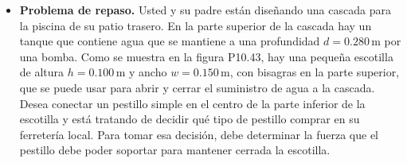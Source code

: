 \documentclass[11pt,a4paper]{article}
\begin{document}
\begin{itemize}
    \item[\textbf{43.}] \textbf{Problema de repaso.} Usted y su padre están diseñando una cascada para la piscina de su patio trasero. En la parte superior de la cascada hay un tanque que contiene agua que se mantiene a una profundidad \(d = 0.280\,\text{m}\) por una bomba. Como se muestra en la figura P10.43, hay una pequeña escotilla de altura \(h = 0.100\,\text{m}\) y ancho \(w = 0.150\,\text{m}\), con bisagras en la parte superior, que se puede usar para abrir y cerrar el suministro de agua a la cascada. Desea conectar un pestillo simple en el centro de la parte inferior de la escotilla y está tratando de decidir qué tipo de pestillo comprar en su ferretería local. Para tomar esa decisión, debe determinar la fuerza que el pestillo debe poder soportar para mantener cerrada la escotilla.
    \vspace*{7cm}
\end{itemize}

\newpage
\end{document}
